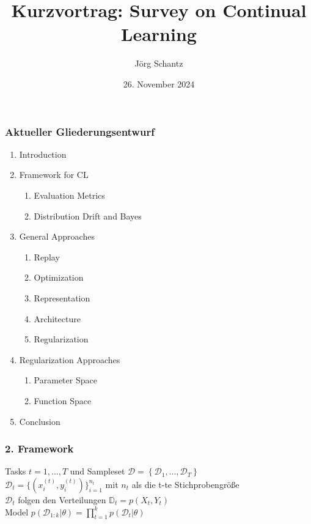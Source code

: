 \documentclass{beamer}
\title{Kurzvortrag: Survey on Continual Learning}
\author{Jörg Schantz}
\date{26. November 2024}
\begin{document}
\begin{frame}[plain]
    \maketitle
\end{frame}
\begin{frame}
    \frametitle{Aktueller Gliederungsentwurf}
    \begin{enumerate}
    	\item Introduction
    	\item Framework for CL
    	\begin{enumerate}
    		\item Evaluation Metrics
    		\item Distribution Drift and Bayes
    	\end{enumerate}
    	\item General Approaches
    	\begin{enumerate}
    		\item Replay
    		\item Optimization
    		\item Representation
    		\item Architecture
    		\item Regularization
    	\end{enumerate}  	
    	\item Regularization Approaches
    	\begin{enumerate}
    		\item Parameter Space
    		\item Function Space
    	\end{enumerate}
    	\item Conclusion
 	\end{enumerate}
\end{frame}
\begin{frame}
	\frametitle{2. Framework}
	Tasks $t = 1, ..., T$ und Sampleset $\mathcal{D} = \left\lbrace \mathcal{D}_1, ..., \mathcal{D}_T\right\rbrace$
	\\
	\vspace{0.5cm}
	$\mathcal{D}_t = \lbrace (x_i^{(t)},y_i^{(t)}) \rbrace_{i=1}^{n_t}$ mit $n_t$ als die t-te Stichprobengröße
	\\
	\vspace{0.5cm}
	$\mathcal{D}_t$ folgen den Verteilungen $\mathbb{D}_t = p(X_t, Y_t)$ 
	\\
	\vspace{0.5cm}
	Model 
	$p(\mathcal{D}_{1:k}|\theta) = \prod_{t=1}^{k}p(\mathcal{D}_t|\theta)$
\end{frame}
\end{document}
